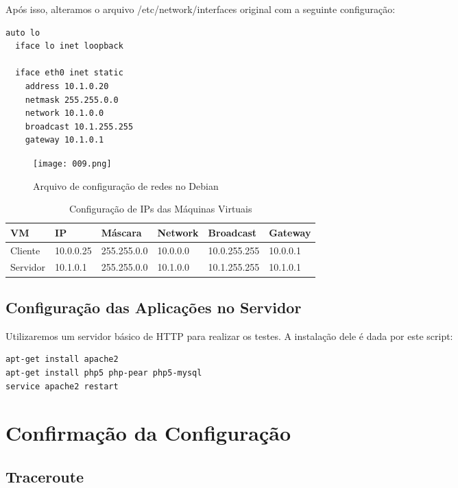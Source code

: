 Após isso, alteramos o arquivo /etc/network/interfaces original com a seguinte configuração:


\begin{lstlisting}[language=bash]
  auto lo
  iface lo inet loopback
  
  iface eth0 inet static
    address 10.1.0.20
    netmask 255.255.0.0
    network 10.1.0.0
    broadcast 10.1.255.255
    gateway 10.1.0.1
\end{lstlisting}

\begin{figure}[H]
\centering
\texttt{[image: 009.png]}
\caption{Arquivo de configuração de redes no Debian}
\label{Rotulo}
\end{figure}


\begin{table}[H]
\centering
\label{my-label}
\begin{tabular}{|l|l|l|l|l|l|}
\hline
VM       & IP        & Máscara     & Network  & Broadcast    & Gateway  \\ \hline
Cliente  & 10.0.0.25 & 255.255.0.0 & 10.0.0.0 & 10.0.255.255 & 10.0.0.1 \\ \hline
Servidor & 10.1.0.1  & 255.255.0.0 & 10.1.0.0 & 10.1.255.255 & 10.1.0.1 \\ \hline
\end{tabular}
\caption{Configuração de IPs das Máquinas Virtuais}
\end{table}

\subsection{Configuração das Aplicações no Servidor}

Utilizaremos um servidor básico de HTTP para realizar os testes. A instalação dele é dada por este script:

\begin{lstlisting}[language=bash]
apt-get install apache2
apt-get install php5 php-pear php5-mysql
service apache2 restart
\end{lstlisting}

\section{Confirmação da Configuração}

\subsection{Traceroute}

